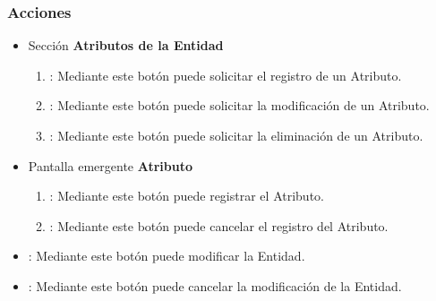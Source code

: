 \subsubsection{Acciones}
\begin{itemize}
  \item Sección \textbf{Atributos de la Entidad}
  \begin{enumerate}
	\item {}: Mediante este botón puede solicitar el registro de un Atributo.
	\item {}: Mediante este botón puede solicitar la modificación de un Atributo.
	\item {}: Mediante este botón puede solicitar la eliminación de un Atributo.
  \end{enumerate}
  \item Pantalla emergente \textbf{Atributo}
  \begin{enumerate}
	\item {}: Mediante este botón puede registrar el Atributo.
	\item {}: Mediante este botón puede cancelar el registro del Atributo.
  \end{enumerate}
 \item {}: Mediante este botón puede modificar la Entidad.
 \item {}: Mediante este botón puede cancelar la modificación de la Entidad.
\end{itemize}
	
	
